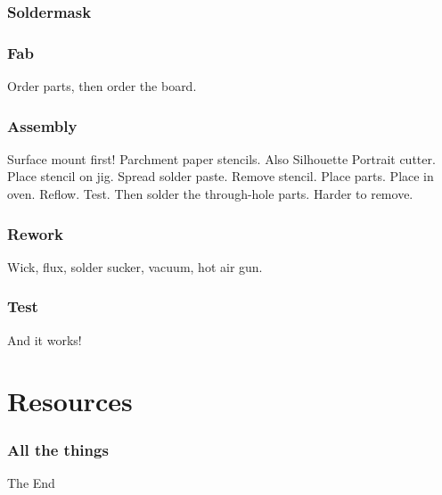 \documentclass{beamer}
\begin{document}

\begin{frame}
\frametitle{Soldermask}
\end{frame}


\begin{frame}
\frametitle{Fab}
Order parts, then order the board. 
\end{frame}


\begin{frame}
\frametitle{Assembly}
Surface mount first! Parchment paper stencils. Also Silhouette Portrait cutter. Place stencil on jig. Spread solder paste. Remove stencil. Place parts. Place in oven. Reflow. Test. Then solder the through-hole parts. Harder to remove. 
\end{frame}


\begin{frame}
\frametitle{Rework}
Wick, flux, solder sucker, vacuum, hot air gun. 
\end{frame}


\begin{frame}
\frametitle{Test}
And it works!
\end{frame}

\section{Resources} 
\begin{frame}
\frametitle{All the things}
\end{frame}

\begin{frame}
\Huge{\centerline{The End}}
\end{frame}

\end{document}
